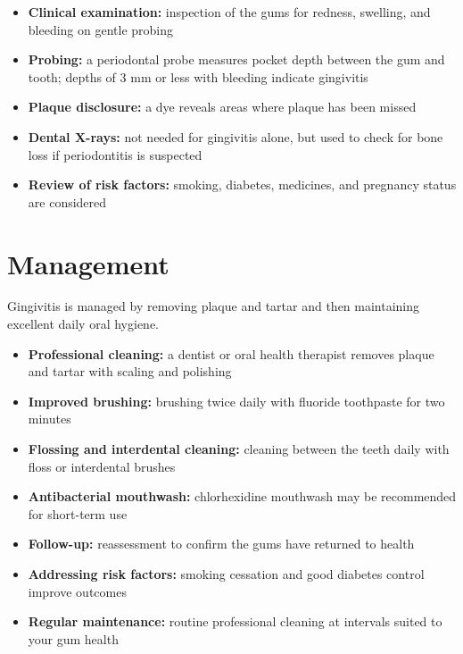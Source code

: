 \begin{itemize}
    \item \textbf{Clinical examination:} inspection of the gums for redness, swelling, and bleeding on gentle probing
    \item \textbf{Probing:} a periodontal probe measures pocket depth between the gum and tooth; depths of 3 mm or less with bleeding indicate gingivitis
    \item \textbf{Plaque disclosure:} a dye reveals areas where plaque has been missed
    \item \textbf{Dental X-rays:} not needed for gingivitis alone, but used to check for bone loss if periodontitis is suspected
    \item \textbf{Review of risk factors:} smoking, diabetes, medicines, and pregnancy status are considered
\end{itemize}

\section*{Management}
Gingivitis is managed by removing plaque and tartar and then maintaining excellent daily oral hygiene.

\begin{itemize}
    \item \textbf{Professional cleaning:} a dentist or oral health therapist removes plaque and tartar with scaling and polishing
    \item \textbf{Improved brushing:} brushing twice daily with fluoride toothpaste for two minutes
    \item \textbf{Flossing and interdental cleaning:} cleaning between the teeth daily with floss or interdental brushes
    \item \textbf{Antibacterial mouthwash:} chlorhexidine mouthwash may be recommended for short-term use
    \item \textbf{Follow-up:} reassessment to confirm the gums have returned to health
    \item \textbf{Addressing risk factors:} smoking cessation and good diabetes control improve outcomes
    \item \textbf{Regular maintenance:} routine professional cleaning at intervals suited to your gum health
\end{itemize}

